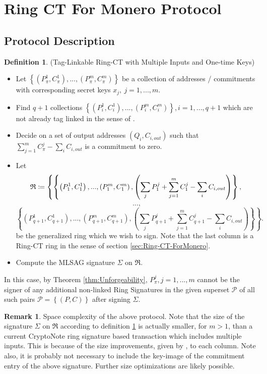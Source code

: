 \documentclass[12pt,english]{mrl}
\theoremstyle{definition}
\newtheorem{Defn}[lem]{Definition}
\newtheorem{rem}[lem]{Remark}
\newenvironment{defn}{\begin{Defn}\rm}{\end{Defn}}
\numberwithin{equation}{section}
\numberwithin{figure}{section}
\numberwithin{equation}{section}
\numberwithin{equation}{section}
\numberwithin{figure}{section}
\begin{document}
\section{\label{sec:Ring-CT-ForMonero}Ring CT For Monero Protocol}


\subsection{Protocol Description}
\begin{defn}
\label{RCTProtocol}(Tag-Linkable Ring-CT with
Multiple Inputs and One-time Keys) \end{defn}
\begin{itemize}
\item Let $\left\{ \left(P_{\pi}^{1},C_{\pi}^{1}\right),...,\left(P_{\pi}^{m},C_{\pi}^{m}\right)\right\} $
be a collection of addresses / commitments with corresponding secret
keys $x_{j},\ j=1,...,m$. 
\item Find $q+1$ collections $\left\{ \left(P_{i}^{1},C_{i}^{1}\right),...,\left(P_{i}^{m},C_{i}^{m}\right)\right\} ,i=1,...,q+1$
which are not already tag linked in the sense of \cite[page 6]{FS}. 
\item Decide on a set of output addresses $\left(Q_{i},C_{i,out}\right)$
such that $\sum_{j=1}^{m}C_{\pi}^{j}-\sum_{i}C_{i,out}$ is a commitment
to zero. 
\item Let 
\[
\mbox{\ensuremath{\mathfrak{R}}}\coloneqq\left\{ \left\{ \left(P_{1}^{1},C_{1}^{1}\right),...,\left(P_{1}^{m},C_{1}^{m}\right),\left(\sum_{j}P_{1}^{j}+\sum_{j=1}^{m}C_{1}^{j}-\sum_{i}C_{i,out}\right)\right\} ,\right.
\]
\[
...,
\]
\[
\left.\left\{ \left(P_{q+1}^{1},C_{q+1}^{1}\right),...,\left(P_{q+1}^{m},C_{q+1}^{m}\right),\left(\sum_{j}P_{q+1}^{j}+\sum_{j=1}^{m}C_{q+1}^{j}-\sum_{i}C_{i,out}\right)\right\} \right\} .
\]
 be the generalized ring which we wish to sign. Note that the last
column is a Ring-CT ring in the sense of section \ref{sec:Ring-CT-ForMonero}. 
\item Compute the MLSAG signature $\Sigma$ on $\mathfrak{R}.$
\end{itemize}
In this case, by Theorem \ref{thm:Unforgeability}, $P_{\pi}^{j},j=1,...,m$ cannot be the signer of any
additional non-linked Ring Signatures in the given superset $\mathcal{P}$
of all such pairs $\mathcal{P}=\left\{ \left(P,C\right)\right\} $
after signing $\Sigma$. 
\begin{rem}
Space complexity of the above protocol. Note that the size of the
signature $\Sigma$ on $\mathfrak{R}$ according to definition \ref{RCTProtocol}
is actually smaller, for $m>1$, than a current CryptoNote \cite{CN}
ring signature based transaction which includes multiple inputs. This
is because of the size improvements, given by \cite{LWW}, to each
column. Note also, it is probably not necessary to include the key-image
of the commitment entry of the above signature. Further size optimizations
are likely possible.\end{rem}
\end{document}
